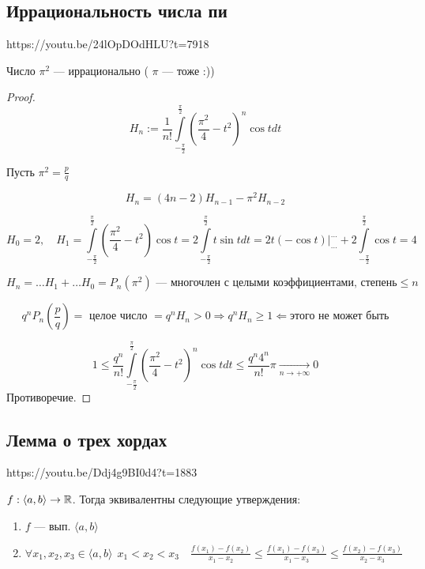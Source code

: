 \documentclass[../main.tex]{subfiles}
\begin{document}
\subsection{Иррациональность числа пи}
https://youtu.be/24lOpDOdHLU?t=7918

\begin{theorem}
    Число $\pi^2$ --- иррационально (
    $\pi$ --- тоже :))
\end{theorem}
\begin{proof}

$$H_n:=\frac{1}{n!}\int\limits_{-\frac{\pi}{2}}^{\frac{\pi}{2}}\left(\frac{\pi^2}{4}-t^2\right)^n\cos t dt$$

    Пусть $\pi^2=\frac{p}{q}$

    $$H_n=(4n-2)H_{n-1}-\pi^2 H_{n-2}$$

    $$H_0 = 2, \quad H_1=\int\limits_{-\frac{\pi}{2}}^{\frac{\pi}{2}}(\frac{\pi^2}{4}-t^2)\cos t = 2\int\limits_{-\frac{\pi}{2}}^{\frac{\pi}{2}} t\sin t dt = 2t(-\cos t)\Big|_{\ldots}^{\ldots}+2\int\limits_{-\frac{\pi}{2}}^{\frac{\pi}{2}} \cos t = 4$$

    $$H_n=\ldots H_1+\ldots H_0 = P_n(\pi^2) \text{ --- многочлен с целыми коэффициентами, степень}\leq n$$
    
    $$q^{n}P_n\left(\frac{p}{q}\right)=\text{ целое число }=q^{n}H_n>0 \Rightarrow q^{n}H_n\geq 1 \Leftarrow\text{этого не может быть}$$
    
    $$1\leq\frac{q^{n}}{n!}\int\limits_{-\frac{\pi}{2}}^{\frac{\pi}{2}}\left(\frac{\pi^2}{4}-t^2\right)^n\cos t dt \leq \frac{q^{n} 4^n}{n!}\pi\xrightarrow[n\to +\infty]{}0$$
    Противоречие.
\end{proof}


\newpage


\subsection{Лемма о трех хордах}
 https://youtu.be/Ddj4g9BI0d4?t=1883

 $f:\langle a,b\rangle\to\mathbb{R}$. Тогда эквивалентны следующие утверждения:
    \begin{enumerate}
        \item $f$ --- вып. $\langle a,b\rangle$
        \item $\forall x_1,x_2,x_3\in\langle a,b\rangle \ \ x_1<x_2<x_3 \quad \frac{f(x_1)-f(x_2)}{x_1-x_2}\leq\frac{f(x_1)-f(x_3)}{x_1-x_3}\leq\frac{f(x_2)-f(x_3)}{x_2-x_3}$
    \end{enumerate}
    
\end{document}
